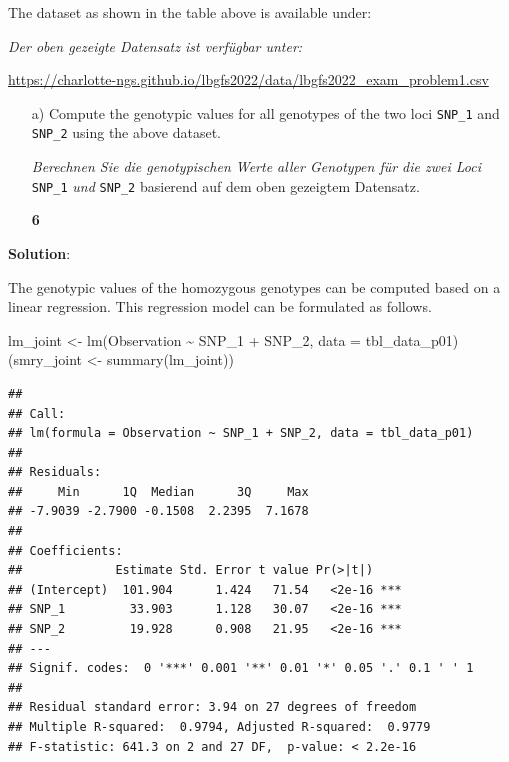 \documentclass[
]{article}
\newenvironment{Shaded}{\begin{snugshade}}{\end{snugshade}}
\newcommand{\AttributeTok}[1]{\textcolor[rgb]{0.77,0.63,0.00}{#1}}
\newcommand{\FunctionTok}[1]{\textcolor[rgb]{0.00,0.00,0.00}{#1}}
\newcommand{\NormalTok}[1]{#1}
\newcommand{\OtherTok}[1]{\textcolor[rgb]{0.56,0.35,0.01}{#1}}
\newcommand{\SpecialCharTok}[1]{\textcolor[rgb]{0.00,0.00,0.00}{#1}}
\newcommand{\points}[1]
{\begin{flushright}\textbf{#1}\end{flushright}}
\newcommand{\solstart}
{\vspace{3ex}\textbf{Solution}:}
\begin{document}
\clearpage
\pagebreak

The dataset as shown in the table above is available under:

\textit{Der oben gezeigte Datensatz ist verfügbar unter:}

\url{https://charlotte-ngs.github.io/lbgfs2022/data/lbgfs2022_exam_problem1.csv}

\vspace{3ex}

\begin{enumerate}
\item[a)] Compute the genotypic values for all genotypes of the two loci  \verb+SNP_1+ and \verb+SNP_2+ using the above dataset.

\textit{Berechnen Sie die genotypischen Werte aller Genotypen für die zwei Loci } \verb+SNP_1+ \textit{ und } \verb+SNP_2+ basierend auf dem oben gezeigtem Datensatz.  
\points{6}
\end{enumerate}

\solstart

The genotypic values of the homozygous genotypes can be computed based
on a linear regression. This regression model can be formulated as
follows.

\begin{Shaded}
\begin{Highlighting}[]
\NormalTok{lm\_joint }\OtherTok{\textless{}{-}} \FunctionTok{lm}\NormalTok{(Observation }\SpecialCharTok{\textasciitilde{}}\NormalTok{ SNP\_1 }\SpecialCharTok{+}\NormalTok{ SNP\_2, }\AttributeTok{data =}\NormalTok{ tbl\_data\_p01)}
\NormalTok{(smry\_joint }\OtherTok{\textless{}{-}} \FunctionTok{summary}\NormalTok{(lm\_joint))}
\end{Highlighting}
\end{Shaded}

\begin{verbatim}
## 
## Call:
## lm(formula = Observation ~ SNP_1 + SNP_2, data = tbl_data_p01)
## 
## Residuals:
##     Min      1Q  Median      3Q     Max 
## -7.9039 -2.7900 -0.1508  2.2395  7.1678 
## 
## Coefficients:
##             Estimate Std. Error t value Pr(>|t|)    
## (Intercept)  101.904      1.424   71.54   <2e-16 ***
## SNP_1         33.903      1.128   30.07   <2e-16 ***
## SNP_2         19.928      0.908   21.95   <2e-16 ***
## ---
## Signif. codes:  0 '***' 0.001 '**' 0.01 '*' 0.05 '.' 0.1 ' ' 1
## 
## Residual standard error: 3.94 on 27 degrees of freedom
## Multiple R-squared:  0.9794, Adjusted R-squared:  0.9779 
## F-statistic: 641.3 on 2 and 27 DF,  p-value: < 2.2e-16
\end{verbatim}
\end{document}
